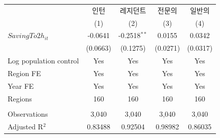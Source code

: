 \begingroup
\centering
\begin{tabular}{lcccc}
   \toprule
                          & 인턴     & 레지던트       & 전문의   & 일반의 \\   
                          & (1)      & (2)            & (3)      & (4)\\  
   \midrule 
   $SavingTo2h_{it}$      & -0.0641  & -0.2518$^{**}$ & 0.0155   & 0.0342\\   
                          & (0.0663) & (0.1275)       & (0.0271) & (0.0317)\\   
   Log population control & Yes      & Yes            & Yes      & Yes\\  
   Region FE              & Yes      & Yes            & Yes      & Yes\\  
   Year FE                & Yes      & Yes            & Yes      & Yes\\  
   Regions                & 160      & 160            & 160      & 160\\  
    \\
   Observations           & 3,040    & 3,040          & 3,040    & 3,040\\  
   Adjusted R$^2$         & 0.83488  & 0.92504        & 0.98982  & 0.86035\\  
   \bottomrule
\end{tabular}
\par\endgroup
